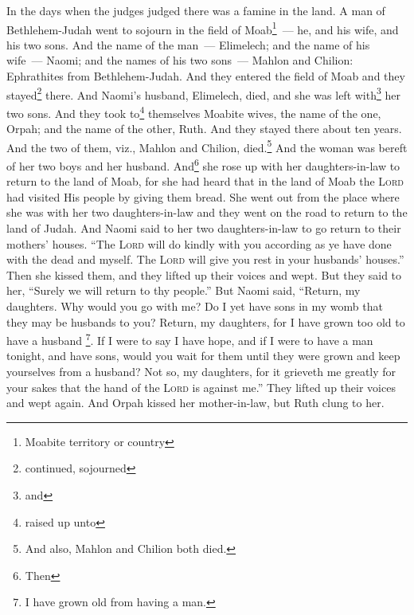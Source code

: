 


\begin{enumerate*}[mode=unboxed]
     In the days when the judges judged there was a famine in the land. A man of Bethlehem-Judah went to sojourn in the field of Moab\footnote{Moabite territory or country}~--- he, and his wife, and his two sons.%
     And the name of the man~--- Elimelech; and the name of his wife~--- Naomi; and the names of his two sons~--- Mahlon and Chilion: Ephrathites from Bethlehem-Judah. And they entered the field of Moab and they stayed\footnote{continued, sojourned} there.%
     And Naomi's husband, Elimelech, died, and she was left with\footnote{and} her two sons.%
     And they took to\footnote{raised up unto} themselves Moabite wives, the name of the one, Orpah; and the name of the other, Ruth. And they stayed there about ten years.%
     And the two of them, viz., Mahlon and Chilion, died.\footnote{ And also, Mahlon and Chilion both died.} And the woman was bereft of her two boys and her husband.%
     And\footnote{Then} she rose up with her daughters-in-law to return to the land of Moab, for she had heard that in the land of Moab the \textsc{Lord} had visited His people by giving them bread.%
     She went out from the place where she was with her two daughters-in-law and they went on the road to return to the land of Judah.%
     And Naomi said to her two daughters-in-law to go return to their mothers' houses. ``The \textsc{Lord} will do kindly with you according as ye have done with the dead and myself.%
     The \textsc{Lord} will give you rest in your husbands' houses.'' Then she kissed them, and they lifted up their voices and wept.%
     But they said to her, ``Surely we will return to thy people.''%
     But Naomi said, ``Return, my daughters. Why would you go with me? Do I yet have sons in my womb that they may be husbands to you?%
     Return, my daughters, for I have grown too old to have a husband \footnote{I have grown old from having a man.}. If I were to say I have hope, and if I were to have a man tonight, and have sons,%
     would you wait for them until they were grown and keep yourselves from a husband? Not so, my daughters, for it grieveth me greatly for your sakes that the hand of the \textsc{Lord} is against me.''%
     They lifted up their voices and wept again. And Orpah kissed her mother-in-law, but Ruth clung to her.%

\end{enumerate*}
